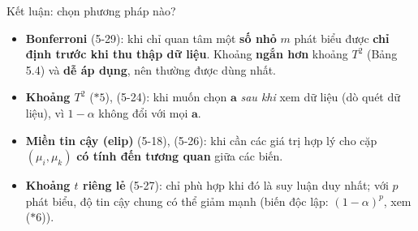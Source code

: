 \begin{frame}{Kết luận: chọn phương pháp nào?}
  \small
  \begin{itemize}
    \item \textbf{Bonferroni} (5-29): khi chỉ quan tâm một \textbf{số nhỏ} $m$ phát biểu được \textbf{chỉ định trước khi thu thập dữ liệu}. Khoảng \textbf{ngắn hơn} khoảng $T^2$ (Bảng 5.4) và \textbf{dễ áp dụng}, nên thường được dùng nhất.
    \item \textbf{Khoảng $T^2$} ($*5$), (5-24): khi muốn chọn $\mathbf{a}$ \emph{sau khi} xem dữ liệu (dò quét dữ liệu), vì $1-\alpha$ không đổi với mọi $\mathbf{a}$.
    \item \textbf{Miền tin cậy (elip)} (5-18), (5-26): khi cần các giá trị hợp lý cho cặp $(\mu_i,\mu_k)$ \textbf{có tính đến tương quan} giữa các biến.
    \item \textbf{Khoảng $t$ riêng lẻ} (5-27): chỉ phù hợp khi đó là suy luận duy nhất; với $p$ phát biểu, độ tin cậy chung có thể giảm mạnh (biến độc lập: $(1-\alpha)^p$, xem ($*6$)).
  \end{itemize}
\end{frame}
